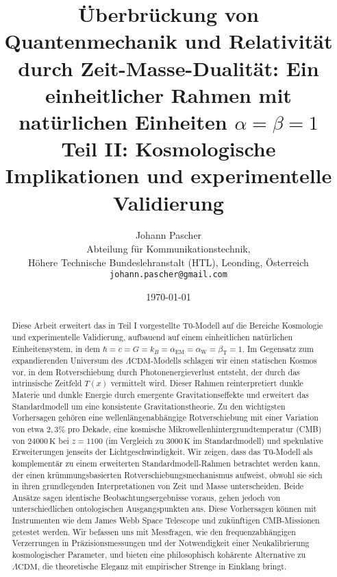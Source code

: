 \documentclass[12pt,a4paper]{article}
\newcommand{\Tfield}{T(x)}
\newcommand{\alphaEM}{\alpha_{\text{EM}}}
\newcommand{\alphaW}{\alpha_{\text{W}}}
\newcommand{\betaT}{\beta_{\text{T}}}
\newcommand{\LCDM}{\Lambda\text{CDM}}
\begin{document}
	
	\title{Überbrückung von Quantenmechanik und Relativität durch Zeit-Masse-Dualität: Ein einheitlicher Rahmen mit natürlichen Einheiten \(\alpha = \beta = 1\) \\ Teil II: Kosmologische Implikationen und experimentelle Validierung}
	\author{Johann Pascher\\
		Abteilung für Kommunikationstechnik, \\Höhere Technische Bundeslehranstalt (HTL), Leonding, Österreich\\
		\texttt{johann.pascher@gmail.com}}
	\date{\today}
	
	\maketitle
	
	\begin{abstract}
		Diese Arbeit erweitert das in Teil I vorgestellte T0-Modell auf die Bereiche Kosmologie und experimentelle Validierung, aufbauend auf einem einheitlichen natürlichen Einheitensystem, in dem \(\hbar = c = G = k_B = \alphaEM = \alphaW = \betaT = 1\). Im Gegensatz zum expandierenden Universum des \(\LCDM\)-Modells schlagen wir einen statischen Kosmos vor, in dem Rotverschiebung durch Photonenergieverlust entsteht, der durch das intrinsische Zeitfeld \(\Tfield\) vermittelt wird. Dieser Rahmen reinterpretiert dunkle Materie und dunkle Energie durch emergente Gravitationseffekte und erweitert das Standardmodell um eine konsistente Gravitationstheorie. Zu den wichtigsten Vorhersagen gehören eine wellenlängenabhängige Rotverschiebung mit einer Variation von etwa \(2,3\%\) pro Dekade, eine kosmische Mikrowellenhintergrundtemperatur (CMB) von \(24000 \, \text{K}\) bei \(z = 1100\) (im Vergleich zu \(3000 \, \text{K}\) im Standardmodell) und spekulative Erweiterungen jenseits der Lichtgeschwindigkeit. Wir zeigen, dass das T0-Modell als komplementär zu einem erweiterten Standardmodell-Rahmen betrachtet werden kann, der einen krümmungsbasierten Rotverschiebungsmechanismus aufweist, obwohl sie sich in ihren grundlegenden Interpretationen von Zeit und Masse unterscheiden. Beide Ansätze sagen identische Beobachtungsergebnisse voraus, gehen jedoch von unterschiedlichen ontologischen Ausgangspunkten aus. Diese Vorhersagen können mit Instrumenten wie dem James Webb Space Telescope und zukünftigen CMB-Missionen getestet werden. Wir befassen uns mit Messfragen, wie den frequenzabhängigen Verzerrungen in Präzisionsmessungen und der Notwendigkeit einer Neukalibrierung kosmologischer Parameter, und bieten eine philosophisch kohärente Alternative zu \(\LCDM\), die theoretische Eleganz mit empirischer Strenge in Einklang bringt.
	\end{abstract}
	\newpage		
	\tableofcontents
	\newpage
\end{document}
